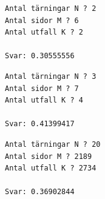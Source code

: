 \begin{verbatim}
Antal tärningar N ? 2
Antal sidor M ? 6 
Antal utfall K ? 2

Svar: 0.30555556
\end{verbatim}

\begin{verbatim}
Antal tärningar N ? 3
Antal sidor M ? 7
Antal utfall K ? 4

Svar: 0.41399417
\end{verbatim}

\begin{verbatim}
Antal tärningar N ? 20
Antal sidor M ? 2189
Antal utfall K ? 2734

Svar: 0.36902844
\end{verbatim}


